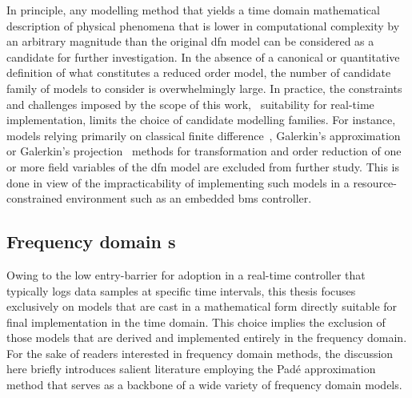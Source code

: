 In  principle, any  modelling  method  that yields  a  time domain  mathematical
description of physical  phenomena that is lower in  computational complexity by
an  arbitrary magnitude  than the  original  \gls{dfn} model  can be  considered
as  a  candidate for  further  investigation.  In  the  absence of  a  canonical
or  quantitative definition  of  what  constitutes a  reduced  order model,  the
number of  candidate family of  models to  consider is overwhelmingly  large. In
practice, the  constraints and  challenges imposed  by the  scope of  this work,
\viz~suitability for  real-time implementation,  limits the choice  of candidate
modelling  families.  For  instance,   models  relying  primarily  on  classical
finite  difference~\cite{Smith2006}, Galerkin's  approximation~\cite{Dao2012} or
Galerkin's  projection~\cite{Fan2016,Fan2018}  methods  for  transformation  and
order  reduction of  one or  more  field variables  of the  \gls{dfn} model  are
excluded from  further study. This  is done in  view of the  impracticability of
implementing  such  models in  a  resource-constrained  environment such  as  an
embedded \gls{bms} controller.

\subsection{Frequency   domain   s}\label{subsec:freqdomainroms}

Owing  to the  low entry-barrier  for adoption  in a  real-time controller  that
typically  logs data  samples at  specific time  intervals, this  thesis focuses
exclusively on models that are cast in a mathematical form directly suitable for
final implementation  in the time domain.  This choice implies the  exclusion of
those models that are derived and  implemented entirely in the frequency domain.
For the sake  of readers interested in frequency domain  methods, the discussion
here  briefly introduces  salient literature  employing the  Padé approximation
method that serves as a backbone of a wide variety of frequency domain models.


